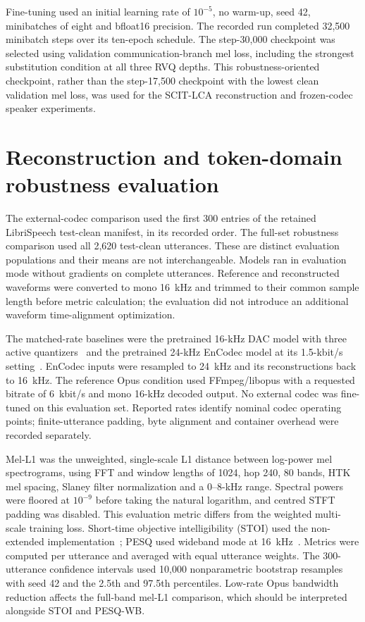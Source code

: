 Fine-tuning used an initial learning rate of $10^{-5}$, no warm-up, seed 42, minibatches of eight and bfloat16 precision. The recorded run completed 32,500 minibatch steps over its ten-epoch schedule. The step-30,000 checkpoint was selected using validation communication-branch mel loss, including the strongest substitution condition at all three RVQ depths. This robustness-oriented checkpoint, rather than the step-17,500 checkpoint with the lowest clean validation mel loss, was used for the SCIT-LCA reconstruction and frozen-codec speaker experiments.

\section{Reconstruction and token-domain robustness evaluation}
The external-codec comparison used the first 300 entries of the retained LibriSpeech test-clean manifest, in its recorded order. The full-set robustness comparison used all 2,620 test-clean utterances. These are distinct evaluation populations and their means are not interchangeable. Models ran in evaluation mode without gradients on complete utterances. Reference and reconstructed waveforms were converted to mono 16~kHz and trimmed to their common sample length before metric calculation; the evaluation did not introduce an additional waveform time-alignment optimization.

The matched-rate baselines were the pretrained 16-kHz DAC model with three active quantizers~\cite{dac} and the pretrained 24-kHz EnCodec model at its 1.5-kbit/s setting~\cite{encodec}. EnCodec inputs were resampled to 24~kHz and its reconstructions back to 16~kHz. The reference Opus condition used FFmpeg/libopus with a requested bitrate of 6~kbit/s and mono 16-kHz decoded output. No external codec was fine-tuned on this evaluation set. Reported rates identify nominal codec operating points; finite-utterance padding, byte alignment and container overhead were recorded separately.

Mel-L1 was the unweighted, single-scale L1 distance between log-power mel spectrograms, using FFT and window lengths of 1024, hop 240, 80 bands, HTK mel spacing, Slaney filter normalization and a 0--8-kHz range. Spectral powers were floored at $10^{-9}$ before taking the natural logarithm, and centred STFT padding was disabled. This evaluation metric differs from the weighted multi-scale training loss. Short-time objective intelligibility (STOI) used the non-extended implementation~\cite{stoi}; PESQ used wideband mode at 16~kHz~\cite{pesq}. Metrics were computed per utterance and averaged with equal utterance weights. The 300-utterance confidence intervals used 10,000 nonparametric bootstrap resamples with seed 42 and the 2.5th and 97.5th percentiles. Low-rate Opus bandwidth reduction affects the full-band mel-L1 comparison, which should be interpreted alongside STOI and PESQ-WB.

